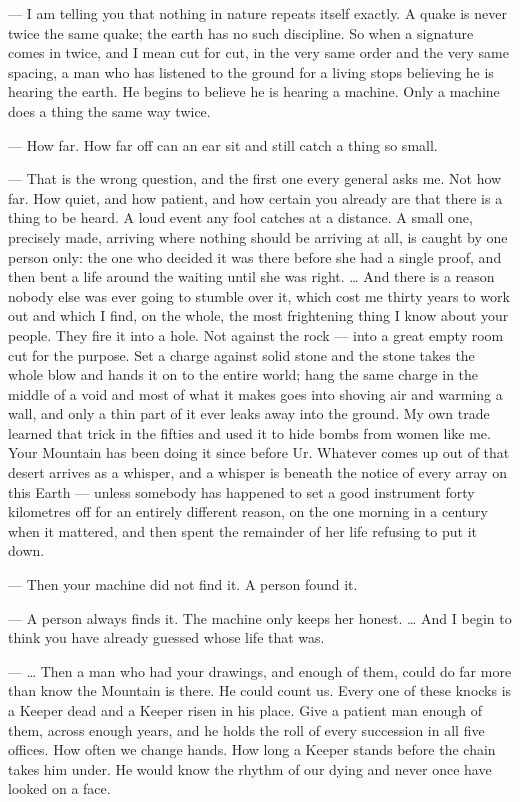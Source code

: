 \begin{room}
--- I am telling you that nothing in nature repeats itself exactly. A quake is never twice the same quake; the earth has no such discipline. So when a signature comes in twice, and I mean cut for cut, in the very same order and the very same spacing, a man who has listened to the ground for a living stops believing he is hearing the earth. He begins to believe he is hearing a machine. Only a machine does a thing the same way twice.

--- How far. How far off can an ear sit and still catch a thing so small.

--- That is the wrong question, and the first one every general asks me. Not how far. How quiet, and how patient, and how certain you already are that there is a thing to be heard. A loud event any fool catches at a distance. A small one, precisely made, arriving where nothing should be arriving at all, is caught by one person only: the one who decided it was there before she had a single proof, and then bent a life around the waiting until she was right. \ldots{} And there is a reason nobody else was ever going to stumble over it, which cost me thirty years to work out and which I find, on the whole, the most frightening thing I know about your people. They fire it into a hole. Not against the rock --- into a great empty room cut for the purpose. Set a charge against solid stone and the stone takes the whole blow and hands it on to the entire world; hang the same charge in the middle of a void and most of what it makes goes into shoving air and warming a wall, and only a thin part of it ever leaks away into the ground. My own trade learned that trick in the fifties and used it to hide bombs from women like me. Your Mountain has been doing it since before Ur. Whatever comes up out of that desert arrives as a whisper, and a whisper is beneath the notice of every array on this Earth --- unless somebody has happened to set a good instrument forty kilometres off for an entirely different reason, on the one morning in a century when it mattered, and then spent the remainder of her life refusing to put it down.

--- Then your machine did not find it. A person found it.

--- A person always finds it. The machine only keeps her honest. \ldots{} And I begin to think you have already guessed whose life that was.

--- \ldots{} Then a man who had your drawings, and enough of them, could do far more than know the Mountain is there. He could count us. Every one of these knocks is a Keeper dead and a Keeper risen in his place. Give a patient man enough of them, across enough years, and he holds the roll of every succession in all five offices. How often we change hands. How long a Keeper stands before the chain takes him under. He would know the rhythm of our dying and never once have looked on a face.


\end{room}
